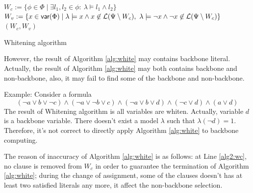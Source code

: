 \begin{algorithm}
\SetAlgoShortEnd
\SetFillComment
{}
$W_c:= \{\phi\in\Phi \mid \exists l_1,l_2\in\phi: \ \lambda\models l_1\wedge l_2\}$\; \label{alg2:inital}
$W_v:=\{x\in \textsf{var}(\Phi)\mid \lambda\models x\wedge x\not\in {\cal L}(\Psi\setminus W_c),
        \ \lambda\models \neg x\wedge \neg x\not\in {\cal L}(\Psi\setminus W_c)\}$\;
\Return $(W_c, W_v)$\;
\caption{Whitening algorithm}
\label{alg:white}
\end{algorithm}

However, the result of Algorithm \ref{alg:white} may contains backbone literal. Actually, the result of Algorithm \ref{alg:white} may both contains backbone and non-backbone, also, it may fail to find some of the backbone and non-backbone.

Example:
Consider a formula
\[(\neg a\vee b\vee\neg c)\wedge(\neg a\vee\neg b\vee c)\wedge(\neg a\vee b\vee d)\wedge(\neg c\vee d)\wedge(a\vee d)\]
The result of Whitening algorithm is all variables are whiten. Actually, variable $d$ is a backbone variable. There doesn't exist a model $\lambda$ such that $\lambda(\neg d)=1$. Therefore, it's not correct to directly apply Algorithm \ref{alg:white} to backbone computing.

The reason of inaccuracy of Algorithm \ref{alg:white} is as follows: at Line \ref{alg2:wc}, no clause is removed from $W_c$ in order to guarantee the termination of Algorithm \ref{alg:white}; during the change of assignment, some of the clauses doesn't has at least two satisfied literals any more, it affect the non-backbone selection.

